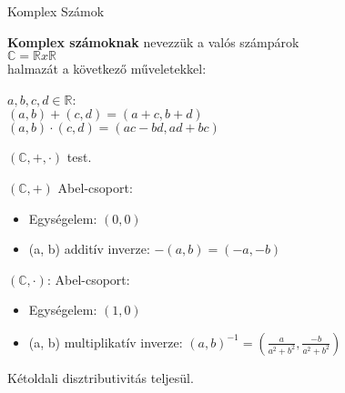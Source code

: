 \begin{frame}
\begin{tcolorbox}
{\Huge Komplex Számok}
\end{tcolorbox}
\end{frame}

\begin{frame}
\begin{tcolorbox}[title={Def.: Komplex számok}]
  \textbf{Komplex számoknak} nevezzük a valós számpárok\\
  $\mathbb{C} = \mathbb{R} x \mathbb{R}$\\
  halmazát a következő műveletekkel:\\
  \mmedskip
  
  $a, b, c, d \in \mathbb{R}$:\\
  $(a, b) + (c, d) = (a + c, b + d)$\\
  $(a, b) \cdot (c, d) = (ac - bd, ad + bc)$
\end{tcolorbox}

\begin{tcolorbox}[title={Ész}]
  $(\mathbb{C}, +, {\cdot})$ test.\\
  \mmedskip
  
  $(\mathbb{C}, +)$ Abel-csoport:\\
  \begin{itemize}
    \item Egységelem: $(0, 0)$
    \item (a, b) additív inverze: $-(a, b) = (-a, -b)$
  \end{itemize}
  \mmedskip
  
  $(\mathbb{C}, {\cdot})$: Abel-csoport:\\
  \begin{itemize}
    \item Egységelem: $(1, 0)$
    \item (a, b) multiplikatív inverze: $(a, b)^{-1} = (\frac{a}{a^2 + b^2}, \frac{-b}{a^2 + b^2})$
  \end{itemize}
  \mmedskip

  Kétoldali disztributivitás teljesül.
\end{tcolorbox}
\end{frame}

